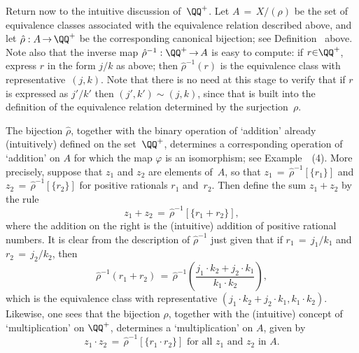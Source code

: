 {        Return now to the intuitive discussion of~${\QQ}^{+}$. Let $A \,=\, X/({\rho})$ be the set of equivalence classes associated with the equivalence relation described above,
    and let $\hat{{\rho}}:A \,{\rightarrow}\, {\QQ}^{+}$ be the corresponding canonical bijection; see Definition~ above.
   Note also that the inverse map $\hat{{\rho}}^{-1}:{\QQ}^{+} \,{\rightarrow}\, A$ is easy to compute:
    if $r{\in}{\QQ}^{+}$, express $r$ in the form $j/k$ as above; then $\hat{{\rho}}^{-1}(r)$ is the equivalence class with representative~$(j,k)$.
    Note that there is no need at this stage to verify that if $r$ is expressed as $j'/k'$ then $(j',k'){\sim}(j,k)$,
    since that is built into the definition of the equivalence relation determined by the surjection~${\rho}$.

        The bijection $\hat{{\rho}}$, together with the binary operation of `addition' already (intuitively) defined on the set~${\QQ}^{+}$,
    determines a corresponding operation of `addition' on $A$ for which the map ${\varphi}$ is an isomorphism; see Example~~(4).
    More precisely, suppose that $z_{1}$ and $z_{2}$ are elements of~$A$,
    so that $z_{1} \,=\, \hat{{\rho}}^{-1}[\{r_{1}\}]$ and $z_{2} \,=\, \hat{{\rho}}^{-1}[\{r_{2}\}]$ for positive rationals $r_{1}$ and~$r_{2}$. Then define the sum $z_{1} + z_{2}$ by the rule
        \begin{displaymath}
        z_{1} + z_{2} \,=\, \hat{{\rho}}^{-1}[\{r_{1}+r_{2}\}],
        \end{displaymath}
    where the addition on the right is the (intuitive) addition of positive rational numbers.
    It is clear from the description of $\hat{{\rho}}^{-1}$ just given that if $r_{1} \,=\, j_{1}/k_{1}$ and $r_{2} \,=\, j_{2}/k_{2}$,
    then 
        \begin{displaymath}
        \hat{{\rho}}^{-1}(r_{1} + r_{2})
    \,=\, 
        \hat{{\rho}}^{-1}\left(\frac{j_{1}{\cdot}k_{2} + j_{2}{\cdot}k_{1}}{k_{1}{\cdot}k_{2}}\right),
        \end{displaymath}
    which is the equivalence class with representative $(j_{1}{\cdot}k_{2} + j_{2}{\cdot}k_{1}, k_{1}{\cdot}k_{2})$.
    Likewise, one sees that the bijection ${\rho}$, together with the (intuitive) concept of `multiplication' on ${\QQ}^{+}$,
    determines a `multiplication' on $A$, given by
        \begin{displaymath}
        z_{1}{\cdot}z_{2} \,=\, \hat{{\rho}}^{-1}[\{r_{1}{\cdot}r_{2}\}] \mbox{ for all $z_{1}$ and $z_{2}$ in $A$}.

\end{displaymath}}
